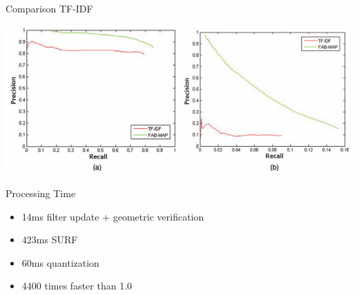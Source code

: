 \begin{frame}{Comparison TF-IDF}
    \begin{center}
        \includegraphics[width=1.0\textwidth]{./media/results_vs_tfidf.png}
    \end{center}
\end{frame}

\begin{frame}{Processing Time}
    \begin{itemize}
        \item 14ms filter update + geometric verification
        \item 423ms SURF
        \item 60ms quantization
        \item 4400 times faster than 1.0
    \end{itemize}
\end{frame}
